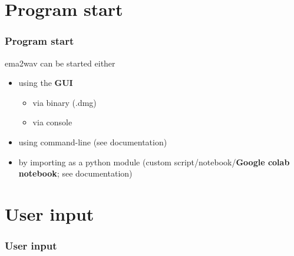 \documentclass[12pt,a4paper]{beamer}
\begin{document}
\section{Program start}
\begin{frame}
    \frametitle{Program start}
    ema2wav can be started either
    \begin{itemize}
        \item using the \textbf{GUI}
        \begin{itemize}
            \item via binary (.dmg)
            \item via console
        \end{itemize}
        \item using command-line (see documentation)
        \item by importing as a python module (custom script/notebook/\textbf{Google colab notebook}; see documentation)
    \end{itemize}
    
\end{frame}

\section{User input}
\begin{frame}
    \frametitle{User input}
\end{frame}
\end{document}
